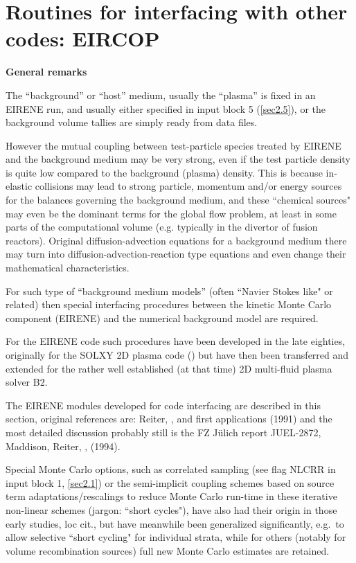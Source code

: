 \chapter{Routines for interfacing with other codes: EIRCOP}
\label{sec4}

\textbf{General remarks} 

\medskip 

The ``background'' or ``host'' medium, usually the ``plasma'' is fixed in an
EIRENE run, and usually either specified in input block 5 (\cref{sec2.5}), or
the background volume tallies are simply ready from data files.
%

However the mutual coupling between test-particle species treated by EIRENE and
the background medium may be very strong, even if the test particle density is
quite low compared to the background (plasma) density.
This is because in-elastic collisions may lead to strong particle, momentum
and/or energy sources for the balances governing the background medium, and
these ``chemical sources" may even be the dominant terms for the global flow
problem, at least in some parts of the computational volume (e.g. typically in
the divertor of fusion reactors).
Original diffusion-advection equations for a background medium there may turn
into diffusion-advection-reaction type equations and even change their
mathematical characteristics.

For such type of ``background medium models'' (often ``Navier Stokes like" or
related) then special interfacing procedures between the kinetic Monte Carlo
component (EIRENE) and the numerical background model are required.

For the EIRENE code such procedures have been developed in the late eighties,
originally for the SOLXY 2D plasma code (\cite{kn:Gerhauser88a}) but have then
been transferred and extended for the rather well established (at that time) 2D
multi-fluid plasma solver B2.

The EIRENE modules developed for code interfacing are described in this
section, original references are: Reiter, \cite{kn:Net}, and first applications
\cite{kn:Reiter91b} (1991) and the most detailed discussion probably still is
the FZ J\"ulich report JUEL-2872, Maddison, Reiter, \cite{kn:Maddison94},
(1994).

Special Monte Carlo options, such as correlated sampling (see flag NLCRR in
input block 1, \cref{sec2.1}) or the semi-implicit coupling schemes based on
source term adaptations/rescalings to reduce Monte Carlo run-time in these
iterative non-linear schemes (jargon: ``short cycles"), have also had their
origin in those early studies, loc cit., but have meanwhile been generalized
significantly, e.g.\ to allow selective ``short cycling" for individual strata,
while for others (notably for volume recombination sources) full new Monte
Carlo estimates are retained.

